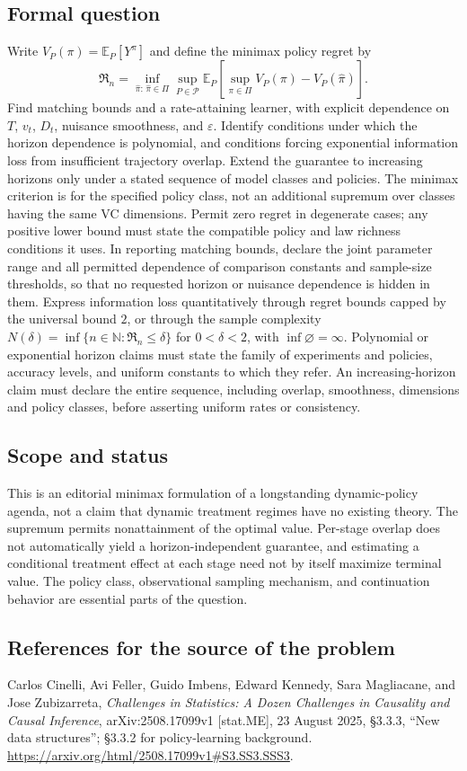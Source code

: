 \documentclass[11pt,a4paper]{article}
\newcommand{\E}{\mathbb E}
\newcommand{\N}{\mathbb N}
\begin{document}
\subsection*{Formal question}
Write $V_P(\pi)=\E_P[Y^\pi]$ and define the minimax policy regret by
\[
 \mathfrak R_n=
 \inf_{\widehat\pi:\,\widehat\pi\in\Pi}\sup_{P\in\mathcal P}
 \E_P\!\left[\sup_{\pi\in\Pi}V_P(\pi)-V_P(\widehat\pi)\right].
\]
Find matching bounds and a rate-attaining learner, with explicit dependence on $T$, $v_t$, $D_t$, nuisance smoothness, and $\varepsilon$. Identify conditions under which the horizon dependence is polynomial, and conditions forcing exponential information loss from insufficient trajectory overlap. Extend the guarantee to increasing horizons only under a stated sequence of model classes and policies. The minimax criterion is for the specified policy class, not an additional supremum over classes having the same VC dimensions. Permit zero regret in degenerate cases; any positive lower bound must state the compatible policy and law richness conditions it uses. In reporting matching bounds, declare the joint parameter range and all permitted dependence of comparison constants and sample-size thresholds, so that no requested horizon or nuisance dependence is hidden in them. Express information loss quantitatively through regret bounds capped by the universal bound $2$, or through the sample complexity $N(\delta)=\inf\{n\in\N:\mathfrak R_n\leq\delta\}$ for $0<\delta<2$, with $\inf\varnothing=\infty$. Polynomial or exponential horizon claims must state the family of experiments and policies, accuracy levels, and uniform constants to which they refer. An increasing-horizon claim must declare the entire sequence, including overlap, smoothness, dimensions and policy classes, before asserting uniform rates or consistency.
\subsection*{Scope and status}
This is an editorial minimax formulation of a longstanding dynamic-policy agenda, not a claim that dynamic treatment regimes have no existing theory. The supremum permits nonattainment of the optimal value. Per-stage overlap does not automatically yield a horizon-independent guarantee, and estimating a conditional treatment effect at each stage need not by itself maximize terminal value. The policy class, observational sampling mechanism, and continuation behavior are essential parts of the question.
\subsection*{References for the source of the problem}
Carlos Cinelli, Avi Feller, Guido Imbens, Edward Kennedy, Sara Magliacane, and Jose Zubizarreta, \emph{Challenges in Statistics: A Dozen Challenges in Causality and Causal Inference}, arXiv:2508.17099v1 [stat.ME], 23 August 2025, \S3.3.3, ``New data structures''; \S3.3.2 for policy-learning background. \url{https://arxiv.org/html/2508.17099v1#S3.SS3.SSS3}.
\end{document}
